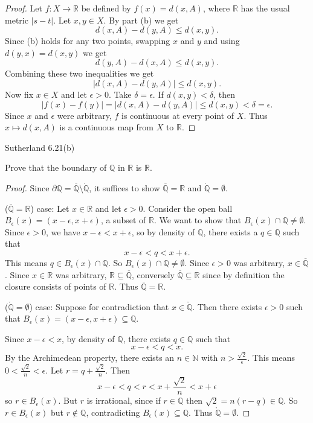\documentclass[minion]{homework}
\newcommand{\Reals}{\ensuremath{\mathbb R}}%
\newcommand{\Rats}{\ensuremath{\mathbb Q}} %
\newcommand{\Nats}{\ensuremath{\mathbb N}} %
\begin{document}
\begin{problems}
\begin{itemize}
\begin{proof}
      Let $f : X \to \Reals$ be defined by $f(x) = d(x,A)$, where $\Reals$ has the usual metric $|s - t|$. Let $x,y \in X$. By part (b) we get
      $$d(x,A) - d(y,A) \leq d(x,y).$$
      Since (b) holds for any two points, swapping $x$ and $y$ and using $d(y,x) = d(x,y)$ we get
      $$d(y,A) - d(x,A) \leq d(x,y).$$
      Combining these two inequalities we get
      $$|d(x,A) - d(y,A)| \leq d(x,y).$$
      Now fix $x \in X$ and let $\epsilon > 0$. Take $\delta = \epsilon$. If $d(x,y) < \delta$, then
      $$|f(x) - f(y)| = |d(x,A) - d(y,A)| \leq d(x,y) < \delta = \epsilon.$$
      Since $x$ and $\epsilon$ were arbitrary, $f$ is continuous at every point of $X$. Thus $x \mapsto d(x,A)$ is a continuous map from $X$ to $\Reals$.
    \end{proof}
\end{itemize}

\problem Sutherland 6.21(b)

Prove that the boundary of $\Rats$ in $\Reals$ is $\Reals$. \newline


\begin{proof} Since $\partial\Rats = \overline{\Rats} \setminus \mathring{\Rats}$, it suffices to show $\overline{\Rats} = \Reals$ and $\mathring{\Rats} = \emptyset$. \newline

($\overline{\Rats} = \Reals$) case: 
  Let $x \in \Reals$ and let $\epsilon > 0$. Consider the open ball $B_\epsilon(x) = (x-\epsilon, x + \epsilon)$, a subset of $\Reals$. We want to show that $B_\epsilon(x) \cap \Rats \neq \emptyset$. Since $\epsilon > 0$, we have $x - \epsilon < x + \epsilon$, so by density of $\Rats$, there exists a $q \in \Rats$ such that
  $$x- \epsilon < q < x + \epsilon.$$
  This means $q \in B_\epsilon(x) \cap \Rats.$
  So $B_\epsilon(x) \cap \Rats \neq \emptyset$. Since $\epsilon > 0$ was arbitrary, $x \in \overline{\Rats}$. Since $x \in \Reals$ was arbitrary, $\Reals \subseteq \overline{\Rats}$, conversely $\overline{\Rats} \subseteq \Reals$ since by definition the closure consists of points of $\Reals$. Thus $\overline{\Rats} = \Reals$.
  
  ($\mathring{\Rats} = \emptyset$) case: Suppose for contradiction that $x \in \mathring{\Rats}$. Then there exists $\epsilon > 0$ such that $B_\epsilon(x) = (x-\epsilon, x + \epsilon) \subseteq \Rats.$

  Since $x - \epsilon < x$, by density of $\Rats$, there exists $q \in \Rats$ such that
  $$x-\epsilon < q < x.$$
  By the Archimedean property, there exists an $n \in \Nats$ with $n > \frac{\sqrt{2}}{\epsilon}.$ This means $0 < \frac{\sqrt{2}}{n} < \epsilon.$
  Let $r = q + \frac{\sqrt{2}}{n}$. Then
  $$x - \epsilon < q < r < x + \frac{\sqrt{2}}{n} < x + \epsilon$$
  so $r \in B_\epsilon(x)$. But $r$ is irrational, since if $r \in \Rats$ then $\sqrt{2} = n(r - q) \in \Rats$. So $r \in B_\epsilon(x)$ but $r \notin \Rats$, contradicting $B_\epsilon(x) \subseteq \Rats$. Thus $\mathring{\Rats} = \emptyset$.


\end{proof}
\end{problems}
\end{document}
